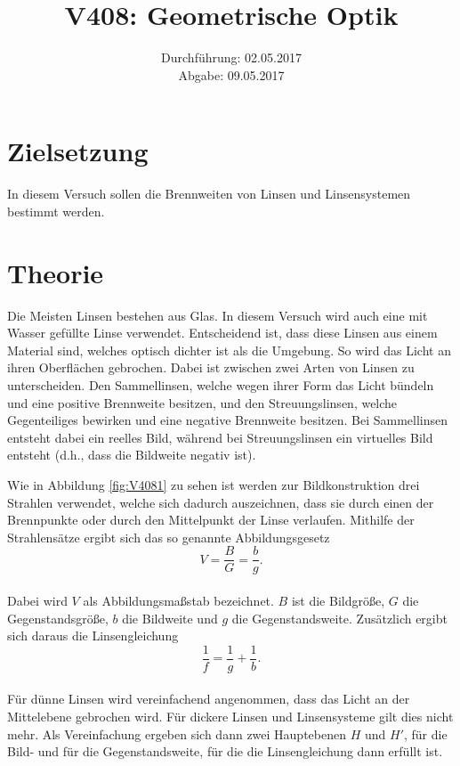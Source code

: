 \documentclass[
  parskip=half,
  bibliography=totoc,     %
  captions=tableheading,  %
  titlepage=firstiscover, %
]{scrartcl}
\title{V408: Geometrische Optik}
\author{
  Simon Schulte
  \texorpdfstring{
    \\
    \href{mailto:simon.schulte@udo.edu}{simon.schulte@udo.edu}
  }{}
  \texorpdfstring{\and}{, }
  Tim Sedlaczek
  \texorpdfstring{
    \\
    \href{mailto:tim.sedlaczek@udo.edu}{tim.sedlaczek@udo.edu}
  }{}
}
\date{Durchführung: 02.05.2017\\
      Abgabe: 09.05.2017}
\begin{document}
\maketitle
\thispagestyle{empty}
\tableofcontents
\newpage
\setcounter{page}{1}
\section{Zielsetzung}
\label{sec:zielsetzung}
In diesem Versuch sollen die Brennweiten von Linsen und Linsensystemen bestimmt
werden.
\section{Theorie}
\label{sec:theorie}
Die Meisten Linsen bestehen aus Glas. In diesem Versuch wird auch eine mit Wasser
gefüllte Linse verwendet. Entscheidend ist, dass diese Linsen aus einem Material
sind, welches optisch dichter ist als die Umgebung. So wird das Licht an ihren
Oberflächen gebrochen. Dabei ist zwischen zwei Arten von Linsen zu unterscheiden.
Den Sammellinsen, welche wegen ihrer Form das Licht bündeln und eine positive
Brennweite besitzen, und den Streuungslinsen, welche Gegenteiliges bewirken und
eine negative Brennweite besitzen. Bei Sammellinsen entsteht dabei ein reelles
Bild, während bei Streuungslinsen ein virtuelles Bild entsteht (d.h., dass die
Bildweite negativ ist).

\noindent
Wie in Abbildung \ref{fig:V4081} zu sehen ist werden zur Bildkonstruktion
drei Strahlen verwendet, welche sich dadurch auszeichnen, dass sie durch einen
der Brennpunkte oder durch den Mittelpunkt der Linse verlaufen.
Mithilfe der Strahlensätze ergibt sich das so genannte Abbildungsgesetz
\begin{equation}
  V = \frac{B}{G} = \frac{b}{g}.
  \label{eqn:abbildung}
\end{equation}\\
Dabei wird $V$ als Abbildungsmaßstab bezeichnet. $B$ ist die Bildgröße, $G$ die
Gegenstandsgröße, $b$ die Bildweite und $g$ die Gegenstandsweite.
Zusätzlich ergibt sich daraus die Linsengleichung
\begin{equation}
  \frac{1}{f} = \frac{1}{g} + \frac{1}{b}.
  \label{eqn:linsen}
\end{equation}\\
Für dünne Linsen wird vereinfachend angenommen, dass das Licht an der Mittelebene
gebrochen wird. Für dickere Linsen und Linsensysteme gilt dies nicht mehr.
Als Vereinfachung ergeben sich dann zwei Hauptebenen $H$ und $H'$,
für die Bild- und für die Gegenstandsweite, für die die Linsengleichung dann
erfüllt ist.
\end{document}
